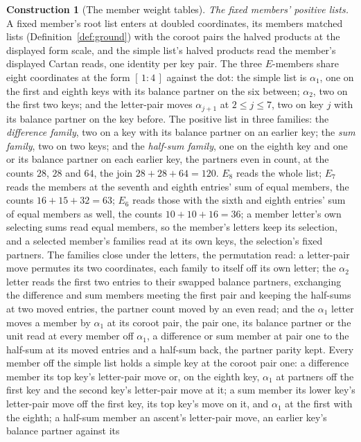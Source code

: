 \documentclass[11pt]{article}
\theoremstyle{definition}
\newtheorem{construction}{Construction}
\begin{document}
\begin{construction}[The member weight tables]
\emph{The fixed members' positive lists.} A fixed member's root
list enters at doubled coordinates, its members matched lists
(Definition~\ref{def:ground}) with the coroot pairs the halved
products at the displayed form scale, and the simple list's
halved products read the member's displayed Cartan reads, one
identity per key pair. The three $E$-members share eight
coordinates at the form $[\,1:4\,]$ against the dot: the simple
list is $\alpha_1$, one on the first and eighth keys with its
balance partner on the six between; $\alpha_2$, two on the first
two keys; and the letter-pair moves $\alpha_{j+1}$ at
$2\le j\le7$, two on key $j$ with its balance partner on the key
before. The positive list in three families: the
\emph{difference family}, two on a key with its balance partner
on an earlier key; the \emph{sum family}, two on two keys; and
the \emph{half-sum family}, one on the eighth key and one or its
balance partner on each earlier key, the partners even in count,
at the counts $28$, $28$ and $64$, the join $28+28+64=120$.
$E_8$ reads the whole list; $E_7$ reads the members at the
seventh and eighth entries' sum of equal members, the counts
$16+15+32=63$; $E_6$ reads those with the sixth and eighth
entries' sum of equal members as well, the counts $10+10+16=36$;
a member letter's own selecting sums read equal members, so the
member's letters keep its selection, and a selected member's
families read at its own keys, the selection's fixed partners.
The families close under the letters, the permutation read: a
letter-pair move permutes its two coordinates, each family to
itself off its own letter; the $\alpha_2$ letter reads the first
two entries to their swapped balance partners, exchanging the
difference and sum members meeting the first pair and keeping
the half-sums at two moved entries, the partner count moved by
an even read; and the $\alpha_1$ letter moves a member by
$\alpha_1$ at its coroot pair, the pair one, its balance partner
or the unit read at every member off $\alpha_1$, a difference or
sum member at pair one to the half-sum at its moved entries and
a half-sum back, the partner parity kept. Every member off the
simple list holds a simple key at the coroot pair one: a
difference member its top key's letter-pair move or, on the
eighth key, $\alpha_1$ at partners off the first key and the
second key's letter-pair move at it; a sum member its lower key's letter-pair
move off the first key, its top key's move on it, and $\alpha_1$
at the first with the eighth; a half-sum member an ascent's
letter-pair move, an earlier key's balance partner against its

\end{construction}
\end{document}
